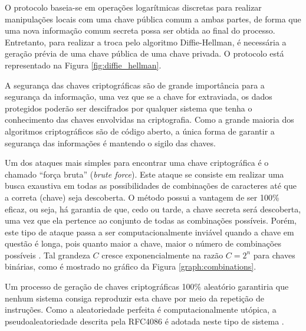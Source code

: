 \documentclass[12pt]{article}
\begin{document}
            O protocolo baseia-se em operações logarítmicas discretas para realizar manipulações locais com uma chave pública comum a ambas partes, de forma que uma nova informação comum secreta possa ser obtida ao final do processo. Entretanto, para realizar a troca pelo algoritmo Diffie-Hellman, é necessária a geração prévia de uma chave pública de uma chave privada. O protocolo está representado na Figura \ref{fig:diffie_hellman}.
            
            
            
            A segurança das chaves criptográficas são de grande importância para a segurança da informação, uma vez que se a chave for extraviada, os dados protegidos poderão ser descifrados por qualquer sistema que tenha o conhecimento das chaves envolvidas na criptografia. Como a grande maioria dos algoritmos criptográficos são de código aberto, a única forma de garantir a segurança das informações é mantendo o sigilo das chaves.
            
            Um dos ataques mais simples para encontrar uma chave criptográfica é o chamado ``força bruta'' (\textit{brute force}). Este ataque se consiste em realizar uma busca exaustiva em todas as possibilidades de combinações de caracteres até que a correta (chave) seja descoberta. O método possui a vantagem de ser 100\% eficaz, ou seja, há garantia de que, cedo ou tarde, a chave secreta será descoberta, uma vez que ela pertence ao conjunto de todas as combinações possíveis. Porém, este tipo de ataque passa a ser computacionalmente inviável quando a chave em questão é longa, pois quanto maior a chave, maior o número de combinações possíveis \cite{stinson2006cryptography}. Tal grandeza $C$ cresce exponencialmente na razão $C = 2^n$ para chaves binárias, como é mostrado no gráfico da Figura \ref{graph:combinations}.
            
            
            
            Um processo de geração de chaves criptográficas 100\% aleatório garantiria que nenhum sistema consiga reproduzir esta chave por meio da repetição de instruções. Como a aleatoriedade perfeita é computacionalmente utópica, a pseudoaleatoriedade descrita pela RFC4086 é adotada neste tipo de sistema \cite{ntwg2005rfc4086}.
            
\end{document}
